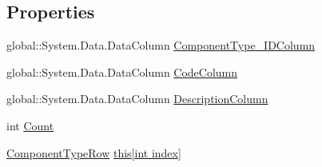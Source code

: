 \subsection*{Properties}
\begin{DoxyCompactItemize}
\item 
global\+::\+System.\+Data.\+Data\+Column \hyperlink{class_env_int_1_1_win32_1_1_field_tech_1_1_manager_1_1_data_sets_1_1_guide_ware_mobile_data_set_1_1_component_type_data_table_a1a38c0e5cee82acd6d759156ac27ab0c}{Component\+Type\+\_\+\+I\+D\+Column}
\item 
global\+::\+System.\+Data.\+Data\+Column \hyperlink{class_env_int_1_1_win32_1_1_field_tech_1_1_manager_1_1_data_sets_1_1_guide_ware_mobile_data_set_1_1_component_type_data_table_ac813af6c69174452148511adfc0a0b37}{Code\+Column}
\item 
global\+::\+System.\+Data.\+Data\+Column \hyperlink{class_env_int_1_1_win32_1_1_field_tech_1_1_manager_1_1_data_sets_1_1_guide_ware_mobile_data_set_1_1_component_type_data_table_a8c855e0235850bc959701e271e881cb2}{Description\+Column}
\item 
int \hyperlink{class_env_int_1_1_win32_1_1_field_tech_1_1_manager_1_1_data_sets_1_1_guide_ware_mobile_data_set_1_1_component_type_data_table_a8de5bb071c5bf3f10538568b7f2f4466}{Count}
\item 
\hyperlink{class_env_int_1_1_win32_1_1_field_tech_1_1_manager_1_1_data_sets_1_1_guide_ware_mobile_data_set_1_1_component_type_row}{Component\+Type\+Row} \hyperlink{class_env_int_1_1_win32_1_1_field_tech_1_1_manager_1_1_data_sets_1_1_guide_ware_mobile_data_set_1_1_component_type_data_table_a57a6f5fa3837933917cfe534fd596598}{this\mbox{[}int index\mbox{]}}
\end{DoxyCompactItemize}
